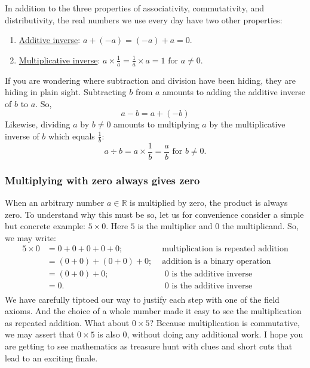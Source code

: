\documentclass[
  a4paper,
]{article}
\begin{document}
In addition to the three properties of associativity, commutativity, and
distributivity, the real numbers we use every day have two other
properties:

\begin{enumerate}
\item
  \href{}{Additive inverse}: \(a + (-a) = (-a) + a = 0\).
\item
  \href{}{Multiplicative inverse}:
  \(a \times \frac{1}{a} = \frac{1}{a} \times a = 1 \mbox{ for } a \ne 0\).
\end{enumerate}

If you are wondering where subtraction and division have been hiding,
they are hiding in plain sight. Subtracting \(b\) from \(a\) amounts to
adding the additive inverse of \(b\) to \(a\). So, \[
a - b = a + (-b)
\] Likewise, dividing \(a\) by \(b \ne 0\) amounts to multiplying \(a\)
by the multiplicative inverse of \(b\) which equals \(\frac{1}{b}\): \[
a \div b = a \times \frac{1}{b} = \frac{a}{b} \mbox{ for } b \ne 0.
\]

\hypertarget{multiplying-with-zero-always-gives-zero}{%
\subsubsection{Multiplying with zero always gives
zero}\label{multiplying-with-zero-always-gives-zero}}

When an arbitrary number \(a \in \mathbb{R}\) is multiplied by zero, the
product is always zero. To understand why this must be so, let us for
convenience consider a simple but concrete example: \(5 \times 0\). Here
\(5\) is the multiplier and \(0\) the multiplicand. So, we may write: \[
\begin{aligned}
5 \times 0 &= 0 + 0 + 0 + 0 + 0; & \mbox{ multiplication is repeated addition}\\
&= (0 + 0) + (0 + 0) + 0; & \mbox{ addition is a binary operation}\\
&= (0 + 0) + 0; & \mbox{ $0$ is the additive inverse}\\
&= 0. & \mbox{ $0$ is the additive inverse}\\
\end{aligned}
\] We have carefully tiptoed our way to justify each step with one of
the field axioms. And the choice of a whole number made it easy to see
the multiplication as repeated addition. What about \(0 \times 5\)?
Because multiplication is commutative, we may assert that \(0 \times 5\)
is also \(0\), without doing any additional work. I hope you are getting
to see mathematics as treasure hunt with clues and short cuts that lead
to an exciting finale.
\end{document}
